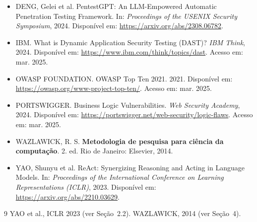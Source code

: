 \documentclass[12pt, a4paper]{article}
\begin{document}
\begin{itemize}

  \item DENG, Gelei et al.
  PentestGPT: An LLM-Empowered Automatic Penetration Testing Framework.
  In: \textit{Proceedings of the USENIX Security Symposium}, 2024.
  Disponível em: \url{https://arxiv.org/abs/2308.06782}.

  \item IBM. What is Dynamic Application Security Testing (DAST)?
  \textit{IBM Think}, 2024.
  Disponível em: \url{https://www.ibm.com/think/topics/dast}. Acesso em: mar. 2025.

  \item OWASP FOUNDATION. OWASP Top Ten 2021. 2021.
  Disponível em: \url{https://owasp.org/www-project-top-ten/}. Acesso em: mar. 2025.

  \item PORTSWIGGER. Business Logic Vulnerabilities.
  \textit{Web Security Academy}, 2024.
  Disponível em: \url{https://portswigger.net/web-security/logic-flaws}. Acesso em: mar. 2025.

  \item WAZLAWICK, R. S. \textbf{Metodologia de pesquisa para ciência da computação}. 2. ed.
  Rio de Janeiro: Elsevier, 2014.

  \item YAO, Shunyu et al.
  ReAct: Synergizing Reasoning and Acting in Language Models.
  In: \textit{Proceedings of the International Conference on Learning Representations (ICLR)}, 2023.
  Disponível em: \url{https://arxiv.org/abs/2210.03629}.

\end{itemize}


\begin{thebibliography}{9}
 YAO et al., ICLR 2023 (ver Seção~2.2).
 WAZLAWICK, 2014 (ver Seção~4).
\end{thebibliography}
\end{document}
